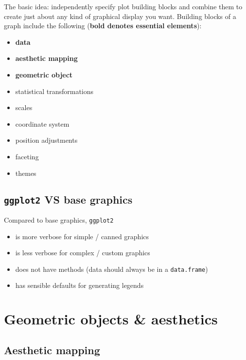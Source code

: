 \documentclass[]{book}
\providecommand{\tightlist}{%
  \setlength{\itemsep}{0pt}\setlength{\parskip}{0pt}}
\begin{document}
The basic idea: independently specify plot building blocks and combine them to create just
about any kind of graphical display you want. Building blocks of a graph include the
following (\textbf{bold denotes essential elements}):

\begin{itemize}
\tightlist
\item
  \textbf{data}
\item
  \textbf{aesthetic mapping}
\item
  \textbf{geometric object}
\item
  statistical transformations
\item
  scales
\item
  coordinate system
\item
  position adjustments
\item
  faceting
\item
  themes
\end{itemize}

\hypertarget{ggplot2-vs-base-graphics}{%
\subsection{\texorpdfstring{\texttt{ggplot2} VS base graphics}{ggplot2 VS base graphics}}\label{ggplot2-vs-base-graphics}}

Compared to base graphics, \texttt{ggplot2}

\begin{itemize}
\tightlist
\item
  is more verbose for simple / canned graphics
\item
  is less verbose for complex / custom graphics
\item
  does not have methods (data should always be in a \texttt{data.frame})
\item
  has sensible defaults for generating legends
\end{itemize}

\hypertarget{geometric-objects-aesthetics}{%
\section{Geometric objects \& aesthetics}\label{geometric-objects-aesthetics}}

\hypertarget{aesthetic-mapping}{%
\subsection{Aesthetic mapping}\label{aesthetic-mapping}}
\end{document}
